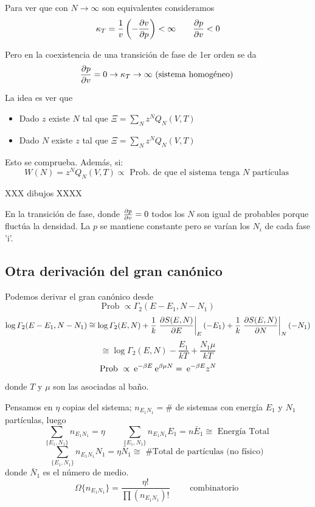 \documentclass[10pt,oneside]{CBFT_book}
\begin{document}
Para ver que con $ N \to \infty $ son equivalentes consideramos 
\[
	\kappa_T = \frac{1}{v} \left( -\frac{\partial^{\hspace{-0.05em}} {v}}{\partial {p}^{\hspace{-0.05em}}} \right) < \infty \qquad \frac{\partial^{\hspace{-0.05em}} {p}}{\partial {v}^{\hspace{-0.05em}}} < 0
\]

Pero en la coexistencia de una transición de fase de 1er orden se da 
\[
	\frac{\partial^{\hspace{-0.05em}} {p}}{\partial {v}^{\hspace{-0.05em}}} = 0  \rightarrow \kappa_T \to \infty \text{ (sistema homogéneo) }
\]

La idea es ver que 
\begin{itemize}
 \item Dado $z$ existe $N$ tal que $ \Xi = \sum_N z^N Q_N(V,T) $
 \item Dado $N$ existe $z$ tal que $ \Xi = \sum_N z^N Q_N(V,T) $
\end{itemize}

Esto se comprueba. Además, si:
\[
	W (N) = z^N Q_N (V,T) \propto \text{ Prob. de que el sistema tenga $N$ partículas }
\]

XXX dibujos XXXX

En la transición de fase, donde $ \frac{\partial^{\hspace{-0.05em}} {p}}{\partial {v}^{\hspace{-0.05em}}} = 0  $ todos los $ N $ son igual de probables porque
fluctúa la densidad. La $p$ se mantiene constante pero se varían los $ N_i $ de cada fase 'i'.


\subsection{Otra derivación del gran canónico}

Podemos derivar el gran canónico desde 
\[
	\text{Prob } \propto \Gamma_2(E-E_1, N-N_1)
\]
\[
	\log  \Gamma_2(E-E_1, N-N_1) \cong  \log \Gamma_2( E, N ) + \frac{1}{k} \left. \frac{\partial^{\hspace{-0.05em}} {S(E,N)}}{\partial {E}^{\hspace{-0.05em}}} \right|_E(-E_1)
	+\frac{1}{k} \left. \frac{\partial^{\hspace{-0.05em}} {S(E,N)}}{\partial {N}^{\hspace{-0.05em}}} \right|_N(-N_1)
\]
\[
	\cong \log \Gamma_2( E, N ) - \frac{E_1}{kT} + \frac{N_1\mu}{kT}
\]
\[
	\text{Prob } \propto \:\mathrm{e}^{-\beta E}  \:\mathrm{e}^{\beta \mu N}  = \:\mathrm{e}^{-\beta E} z^N
\]
donde $T$ y $\mu$ son las asociadas al baño.

Pensamos en $\eta$ copias del sistema; $n_{E_1N_1} = \# $ de sistemas con energía $E_1$ y $N_1$ partículas,
luego 
\[
	\sum_{\{ E_1, N_1 \}} n_{E_1N_1} = \eta \qquad \sum_{\{ E_1, N_1 \}} n_{E_1N_1}E_1 = n\bar{E}_1 \cong 
	\text{ Energía Total }
\]
\[
	\sum_{\{ E_1, N_1 \}} n_{E_1N_1} N_1 = \eta \bar{N}_1 \cong \text{ \# Total de partículas (no físico) }
\]
donde $ \bar{N}_1 $ es el número de medio.
\[
	\Omega\{ n_{E_1N_1} \} = \frac{\eta !}{\prod (n_{E_1N_1})!} \qquad \text{ combinatorio }
\]
\end{document}
